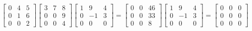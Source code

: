 \documentclass[letterpaper,12pt,fleqn]{article}
\begin{document}
\begin{example}
  $\begin{bmatrix} 0 & 4 & 5 \\ 0 & 1 & 6 \\ 0 & 0 & 2 \end{bmatrix}
  \begin{bmatrix} 3 & 7 & 8 \\ 0 & 0 & 9 \\ 0 & 0 & 4 \end{bmatrix}
  \begin{bmatrix} 1 & 9 & 4 \\ 0 & -1 & 3 \\ 0 & 0 & 0 \end{bmatrix}=
  \begin{bmatrix} 0 & 0 & 46 \\ 0 & 0 & 33 \\ 0 & 0 & 8 \end{bmatrix}
  \begin{bmatrix} 1 & 9 & 4 \\ 0 & -1 & 3 \\ 0 & 0 & 0 \end{bmatrix}=
  \begin{bmatrix} 0 & 0 & 0 \\ 0 & 0 & 0 \\ 0 & 0 & 0\end{bmatrix}$
\end{example}
\end{document}
